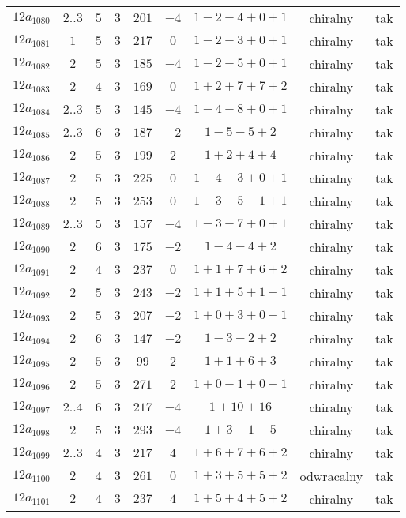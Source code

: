 \begin{longtable}{ccccccccc}
$12a_{1080}$ & $2..3$ & $5$ & $3$ & $201$ & $-4$ & $1-2-4+0+1$ & chiralny & tak \\
$12a_{1081}$ & $1$ & $5$ & $3$ & $217$ & $0$ & $1-2-3+0+1$ & chiralny & tak \\
$12a_{1082}$ & $2$ & $5$ & $3$ & $185$ & $-4$ & $1-2-5+0+1$ & chiralny & tak \\
$12a_{1083}$ & $2$ & $4$ & $3$ & $169$ & $0$ & $1+2+7+7+2$ & chiralny & tak \\
$12a_{1084}$ & $2..3$ & $5$ & $3$ & $145$ & $-4$ & $1-4-8+0+1$ & chiralny & tak \\
$12a_{1085}$ & $2..3$ & $6$ & $3$ & $187$ & $-2$ & $1-5-5+2$ & chiralny & tak \\
$12a_{1086}$ & $2$ & $5$ & $3$ & $199$ & $2$ & $1+2+4+4$ & chiralny & tak \\
$12a_{1087}$ & $2$ & $5$ & $3$ & $225$ & $0$ & $1-4-3+0+1$ & chiralny & tak \\
$12a_{1088}$ & $2$ & $5$ & $3$ & $253$ & $0$ & $1-3-5-1+1$ & chiralny & tak \\
$12a_{1089}$ & $2..3$ & $5$ & $3$ & $157$ & $-4$ & $1-3-7+0+1$ & chiralny & tak \\
$12a_{1090}$ & $2$ & $6$ & $3$ & $175$ & $-2$ & $1-4-4+2$ & chiralny & tak \\
$12a_{1091}$ & $2$ & $4$ & $3$ & $237$ & $0$ & $1+1+7+6+2$ & chiralny & tak \\
$12a_{1092}$ & $2$ & $5$ & $3$ & $243$ & $-2$ & $1+1+5+1-1$ & chiralny & tak \\
$12a_{1093}$ & $2$ & $5$ & $3$ & $207$ & $-2$ & $1+0+3+0-1$ & chiralny & tak \\
$12a_{1094}$ & $2$ & $6$ & $3$ & $147$ & $-2$ & $1-3-2+2$ & chiralny & tak \\
$12a_{1095}$ & $2$ & $5$ & $3$ & $99$ & $2$ & $1+1+6+3$ & chiralny & tak \\
$12a_{1096}$ & $2$ & $5$ & $3$ & $271$ & $2$ & $1+0-1+0-1$ & chiralny & tak \\
$12a_{1097}$ & $2..4$ & $6$ & $3$ & $217$ & $-4$ & $1+10+16$ & chiralny & tak \\
$12a_{1098}$ & $2$ & $5$ & $3$ & $293$ & $-4$ & $1+3-1-5$ & chiralny & tak \\
$12a_{1099}$ & $2..3$ & $4$ & $3$ & $217$ & $4$ & $1+6+7+6+2$ & chiralny & tak \\
$12a_{1100}$ & $2$ & $4$ & $3$ & $261$ & $0$ & $1+3+5+5+2$ & odwracalny & tak \\
$12a_{1101}$ & $2$ & $4$ & $3$ & $237$ & $4$ & $1+5+4+5+2$ & chiralny & tak \\

\end{longtable}
